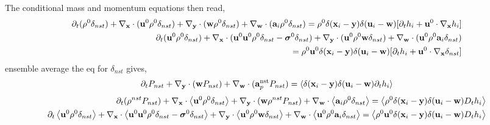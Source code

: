 The conditional mass and momentum equations then read,
\begin{align*}
    \partial_t (\rho^0 \delta_{nst}) 
    + {\mathbf{\nabla}_\textbf{x}} \cdot (\textbf{u}^0 \rho^0 \delta_{nst} ) 
    + {\mathbf{\nabla}_\textbf{y}} \cdot (\textbf{w}   \rho^0 \delta_{nst})
    + {\mathbf{\nabla}_\textbf{w}} \cdot (\textbf{a}_i \rho^0 \delta_{nst})
    = 
    \rho^0 \delta(\textbf{x}_i -\textbf{y}) \delta(\textbf{u}_i - \textbf{w}) 
    [\partial_t h_i 
    +  \textbf{u}^0 \cdot {\mathbf{\nabla}_\textbf{x}} h_i] 
    \\
    \partial_t (\textbf{u}^0 \rho^0 \delta_{nst}) 
    + {\mathbf{\nabla}_\textbf{x}} \cdot (\textbf{u}^0 \textbf{u}^0 \rho^0 \delta_{nst} - \bm\sigma^0 \delta_{nst}) 
    + {\mathbf{\nabla}_\textbf{y}} \cdot (\textbf{u}^0\rho^0 \textbf{w}   \delta_{nst}) 
    + {\mathbf{\nabla}_\textbf{w}} \cdot (\textbf{u}^0\rho^0 \textbf{a}_i \delta_{nst}) \\
    = \rho^0 \textbf{u}^0  
    \delta(\textbf{x}_i -\textbf{y}) \delta(\textbf{u}_i - \textbf{w}) 
    [
        \partial_t h_i 
        + \textbf{u}^0\cdot {\mathbf{\nabla}_\textbf{x}}\delta_{nst}
        ]
    \\
\end{align*}
ensemble average the eq for $\delta_{nst}$ gives, 
\begin{align*}
    \partial_t P_{nst}
    + {\mathbf{\nabla}_\textbf{y}} \cdot (\textbf{w} P_{nst})
    + {\mathbf{\nabla}_\textbf{w}} \cdot (\textbf{a}_p^\text{nst}  P_{nst})
    = 
    \left<\delta(\textbf{x}_i -\textbf{y}) \delta(\textbf{u}_i - \textbf{w}) \partial_t h_i\right>
\end{align*}
\begin{align*}
    \partial_t (\rho^{nst} P_{nst}) 
    + {\mathbf{\nabla}_\textbf{x}} \cdot \left<\textbf{u}^0 \rho^0 \delta_{nst} \right>
    + {\mathbf{\nabla}_\textbf{y}} \cdot (\textbf{w}   \rho^{nst} P_{nst})
    + {\mathbf{\nabla}_\textbf{w}} \cdot \left<\textbf{a}_i \rho^0 \delta_{nst}\right>
    = 
    \left<\rho^0 \delta(\textbf{x}_i -\textbf{y}) \delta(\textbf{u}_i - \textbf{w}) D_t h_i \right>
    \\
    \partial_t \left<\textbf{u}^0 \rho^0 \delta_{nst}\right>
    + {\mathbf{\nabla}_\textbf{x}} \cdot \left<\textbf{u}^0 \textbf{u}^0 \rho^0 \delta_{nst} - \bm\sigma^0 \delta_{nst}\right>
    + {\mathbf{\nabla}_\textbf{y}} \cdot \left<\textbf{u}^0\rho^0 \textbf{w}   \delta_{nst} \right>
    + {\mathbf{\nabla}_\textbf{w}} \cdot \left<\textbf{u}^0\rho^0 \textbf{a}_i \delta_{nst} \right>
    = \left<\rho^0 \textbf{u}^0  
    \delta(\textbf{x}_i -\textbf{y}) \delta(\textbf{u}_i - \textbf{w})D_t h_i \right>
    \\
\end{align*}

